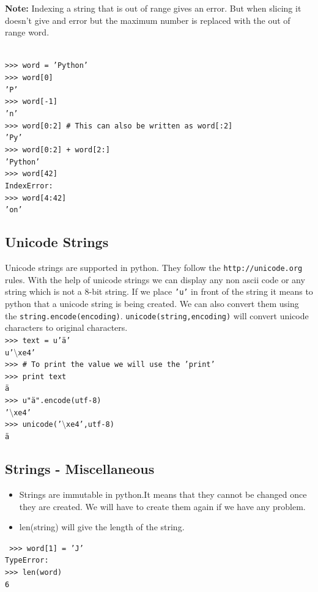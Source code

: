 \documentclass[12pt,a4paper]{article}
\begin{document}
\textbf{Note:} Indexing a string that is out of range gives an error. But when slicing it doesn't give and error but the maximum number is replaced with the out of range word.

\texttt{\\
>>> word = 'Python'\\
>>> word[0]\\
'P'\\
>>> word[-1]\\
'n'\\
>>> word[0:2] \# This can also be written as word[:2]\\
'Py'\\
>>> word[0:2] + word[2:]\\
'Python'\\
>>> word[42]\\
IndexError:\\
>>> word[4:42]\\
'on'
}
\subsection{Unicode Strings}
Unicode strings are supported in python. They follow the \texttt{http://unicode.org} rules. With the help of unicode strings we can display any non ascii code or any string which is not a 8-bit string. If we place \texttt{'u'} in front of the string it means to python that a unicode string is being created. We can also convert them using the \texttt{string.encode(encoding)}. \texttt{unicode(string,encoding)} will convert unicode characters to original characters.
\texttt{\\
>>> text = u'ä'\\
u'$\setminus$xe4'\\
>>> \# To print the value we will use the 'print'\\
>>> print text\\
ä\\
>>> u"ä".encode(utf-8)\\
'$\setminus$xe4'\\
>>> unicode('$\setminus$xe4',utf-8)\\
ä
}

\subsection{Strings - Miscellaneous}
\begin{itemize}
\item Strings are immutable in python.It means that they cannot be changed once they are created. We will have to create them again if we have any problem.
\item len(string) will give the length of the string.
\end{itemize}
\texttt{
>>> word[1] = 'J'\\
TypeError:\\
>>> len(word)\\
6
}
\end{document}
